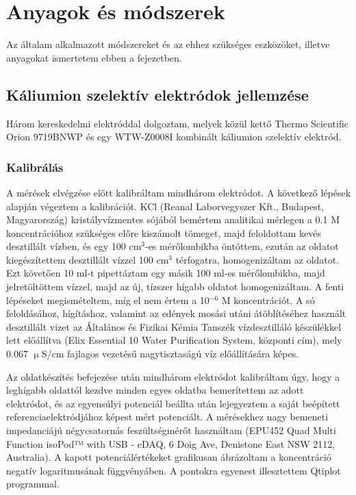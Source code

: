 \chapter{Anyagok és módszerek}
\pagestyle{headings}

Az általam alkalmazott módszereket és az ehhez szükséges eszközöket, illetve anyagokat ismertetem ebben a fejezetben.

\section{Káliumion szelektív elektródok jellemzése}

Három kereskedelmi elektróddal dolgoztam, melyek közül kettő Thermo Scientific Orion 9719BNWP és egy WTW-Z0008I kombinált káliumion szelektív elektród.  

\subsection{Kalibrálás}
A mérések elvégzése előtt kalibráltam mindhárom elektródot. A következő lépések alapján végeztem a kalibrációt. KCl (Reanal Laborvegyszer Kft., Budapest, Magyarország) kristályvízmentes sójából bemértem analitikai mérlegen a 0.1 M koncentrációhoz szükséges előre kiszámolt tömeget, majd feloldottam kevés desztillált vízben, és egy 100 cm$^3$-es mérőlombikba öntöttem, ezután az oldatot kiegészítettem desztillált vízzel 100 cm$^3$ térfogatra, homogenizáltam az oldatot. Ezt követően 10 ml-t pipettáztam egy másik 100 ml-es mérőlombikba, majd jelretöltöttem vízzel, majd az új, tízszer hígabb oldatot homogenizáltam. A fenti lépéseket megismételtem, míg el nem értem a 10$^{-6}$ M koncentrációt. A só feloldásához, hígításhoz, valamint az edények mosási utáni átöblítéséhez használt desztillált vizet az Általános és Fizikai Kémia Tanszék vízdesztilláló készülékkel lett előállítva (Elix Essential 10 Water Purification System, központi cím), mely 0.067 $\upmu$S/cm fajlagos vezetésű nagytisztaságú víz előállítására képes. 

Az oldatkészítés befejezése után mindhárom elektródot kalibráltam úgy, hogy a leghígabb oldattól kezdve minden egyes oldatba bemerítettem az adott elektródot, és az egyensúlyi potenciál beállta után lejegyeztem a saját beépített referenciaelektródjához képest mért potenciált. A mérésekhez nagy bemeneti impedanciájú négycsatornás feszültségmérőt használtam (EPU452 Quad Multi Function isoPod™ with USB - eDAQ, 6 Doig Ave, Denistone East NSW 2112, Australia). A kapott potenciálértékeket grafikusan ábrázoltam a koncentráció negatív logaritmusának függvényáben. A pontokra egyenest illesztettem Qtiplot programmal.  

